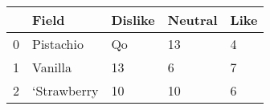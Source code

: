 \begin{tabular}{lllll}
\toprule
{} &        Field & Dislike & Neutral & Like \\
\midrule
0 &    Pistachio &      Qo &      13 &    4 \\
1 &      Vanilla &      13 &       6 &    7 \\
2 &  ‘Strawberry &      10 &      10 &    6 \\
\bottomrule
\end{tabular}
